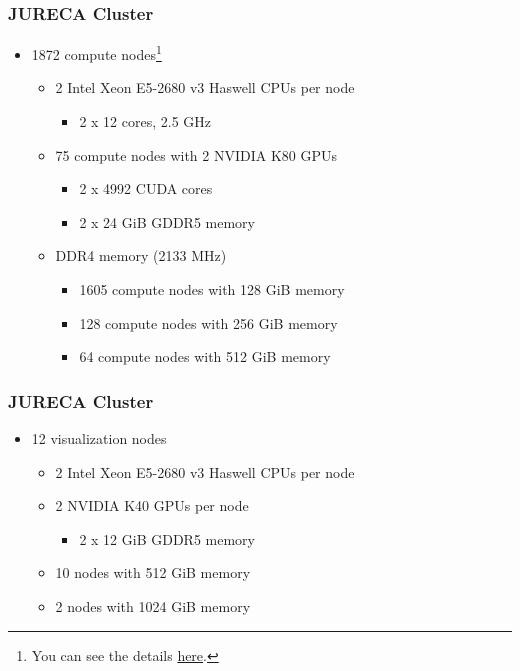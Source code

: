 \documentclass{beamer}
\begin{document}
\begin{frame}
  \frametitle{JURECA Cluster}
  \begin{itemize}
    \item 1872 compute nodes\footnote{You can see the details \href{https://www.fz-juelich.de/ias/jsc/EN/Expertise/Supercomputers/JURECA/Configuration/Configuration_node.html}{here}.}
          \begin{itemize}
            \item 2 Intel Xeon E5-2680 v3 Haswell CPUs per node
                  \begin{itemize}
                    \item 2 x 12 cores, 2.5 GHz
                  \end{itemize}
            \item 75 compute nodes with 2 NVIDIA K80 GPUs
                  \begin{itemize}
                    \item 2 x 4992 CUDA cores
                    \item 2 x 24 GiB GDDR5 memory
                  \end{itemize}
            \item DDR4 memory (2133 MHz)
                  \begin{itemize}
                    \item 1605 compute nodes with 128 GiB memory
                    \item 128 compute nodes with 256 GiB memory
                    \item 64 compute nodes with 512 GiB memory
                  \end{itemize}
          \end{itemize}
  \end{itemize}
\end{frame}

\begin{frame}
  \frametitle{JURECA Cluster}
  \begin{itemize}
    \item 12 visualization nodes
          \begin{itemize}
            \item 2 Intel Xeon E5-2680 v3 Haswell CPUs per node
            \item 2 NVIDIA K40 GPUs per node
                  \begin{itemize}
                    \item 2 x 12 GiB GDDR5 memory
                  \end{itemize}
            \item 10 nodes with 512 GiB memory
            \item 2 nodes with 1024 GiB memory
          \end{itemize}
  \end{itemize}
\end{frame}
\end{document}
